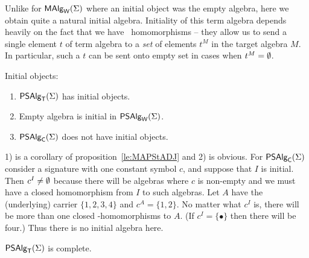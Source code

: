 \documentclass[10pt]{article}
\begin{document}
Unlike for $\mbox{\rm\sf MAlg}_{\sf W}(\Sigma)$ where an initial object was the empty algebra, here
we obtain quite a natural initial algebra. Initiality of this term
algebra depends heavily on the fact that we have \PS\ homomorphisms --
they allow us to send a single element $t$ of term algebra to a {\em
set} of elements $t^M$ in the target algebra $M$. In particular, such
a $t$ can be sent onto empty set in cases when $t^M=\emptyset$.

\begin{Fact}
Initial objects:
\begin{enumerate}\MyLPar
\item
$\mbox{\sf PSAlg}_{\sf T}(\Sigma)$ has initial objects.
\item 
Empty algebra is initial in $\mbox{\sf PSAlg}_{\sf W}(\Sigma)$.
\item
$\mbox{\sf PSAlg}_{\sf C}(\Sigma)$ does not have initial objects.
\end{enumerate}
\end{Fact}

\begin{Proof}
1) is a corollary of proposition~\ref{le:MAPStADJ} and 2) is obvious.  For
$\mbox{\sf PSAlg}_{\sf C}(\Sigma)$ consider a signature with one constant symbol $c$, and
suppose that $I$ is initial. Then $c^I\not=\emptyset$ because there will be
algebras where $c$ is non-empty and we must have a closed homomorphism
from $I$ to such algebras. Let $A$ have the (underlying) carrier
$\{1,2,3,4\}$ and $c^A=\{1,2\}$. No matter what $c^I$ is, there will
be more than one closed \PS-homomorphisms to $A$. (If
$c^I=\{\bullet\}$ then there will be four.) Thus there is no initial
algebra here.
\end{Proof}

\begin{Theorem}
\label{th:MAPStcmpl}
$\mbox{\sf PSAlg}_{\sf T}(\Sigma)$ is complete.
\end{Theorem}
\end{document}
